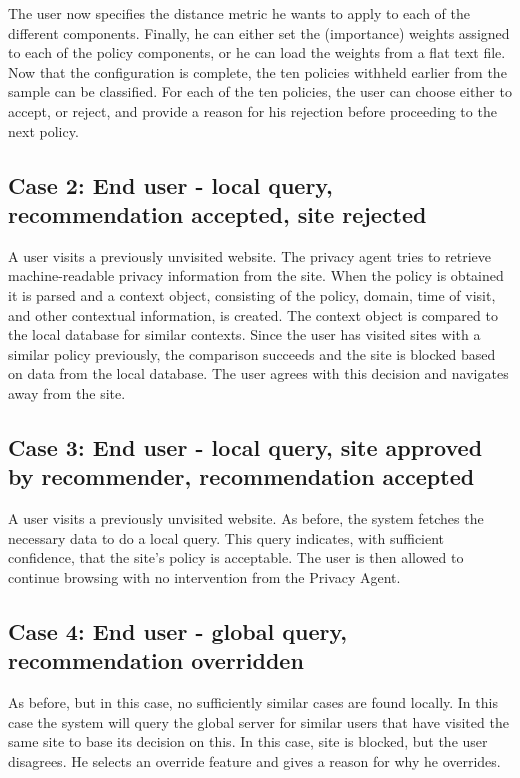 The user now specifies the distance metric he wants to apply to each of the different components. Finally, he can either set the (importance) weights assigned to each of the policy components, or he can load the weights from a flat text file. Now that the configuration is complete, the ten policies withheld earlier from the sample can be classified. For each of the ten policies, the user can choose either to accept, or reject, and provide a reason for his rejection before proceeding to the next policy. 

\subsection{Case 2: End user - local query, recommendation accepted, site rejected}
A user visits a previously unvisited website. The privacy agent tries to retrieve machine-readable privacy information from the site. When the policy is obtained it is parsed and a context object, consisting of the policy, domain, time of visit, and other contextual information, is created. The context object is compared to the local database for similar contexts. Since the user has visited sites with a similar policy previously, the comparison succeeds and the site is blocked based on data from the local database. The user agrees with this decision and navigates away from the site.

\subsection{Case 3: End user - local query, site approved by recommender, recommendation accepted}
A user visits a previously unvisited website. As before, the system fetches the necessary data to do a local query. This query indicates, with sufficient confidence, that the site's policy is acceptable. The user is then allowed to continue browsing with no intervention from the Privacy Agent.

\subsection{Case 4: End user - global query, recommendation overridden}
As before, but in this case, no sufficiently similar cases are found locally. In this case the system will query the global server for similar users that have visited the same site to base its decision on this. In this case, site is blocked, but the user disagrees. He selects an override feature and gives a reason for why he overrides.

